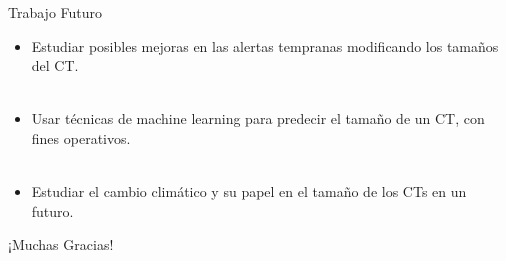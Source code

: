 \begin{frame}{Trabajo Futuro}
    \begin{itemize}
        \item Estudiar posibles mejoras en las alertas tempranas modificando los tamaños del CT.
        \\~\
        \item Usar técnicas de machine learning para predecir el tamaño de un CT, con fines operativos.
        \\~\
        \item Estudiar el cambio climático y su papel en el tamaño de los CTs en un futuro.
    \end{itemize}
\end{frame}



\begin{frame}
\begin{center}
\Huge ¡Muchas Gracias!
\end{center}
\end{frame}